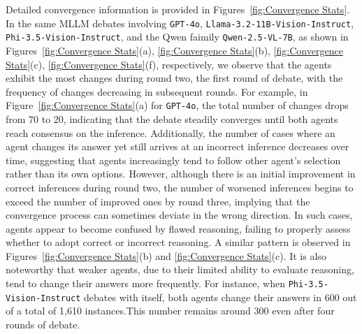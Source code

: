 \documentclass[11pt]{article}
\newcommand{\llamaname}{Llama-3.2-11B-Vision-Instruct}
\newcommand{\Qwenname}{Qwen-2.5-VL-7B}
\newcommand{\phiname}{Phi-3.5-Vision-Instruct}
\renewcommand{\arraystretch}{1.3}
\begin{document}
Detailed convergence information is provided in Figures~\ref{fig:Convergence Stats}. In the same MLLM debates involving \texttt{GPT-4o}, \texttt{\llamaname}, \texttt{\phiname}, and the Qwen faimily \texttt{\Qwenname}, as shown in Figures~\ref{fig:Convergence Stats}(a), \ref{fig:Convergence Stats}(b), \ref{fig:Convergence Stats}(c), \ref{fig:Convergence Stats}(f), respectively, we observe that the agents exhibit the most changes during round two, the first round of debate, with the frequency of changes decreasing in subsequent rounds. For example, in Figure~\ref{fig:Convergence Stats}(a) for \texttt{GPT-4o}, the total number of changes drops from 70 to 20, indicating that the debate steadily converges until both agents reach consensus on the inference. Additionally, the number of cases where an agent changes its answer yet still arrives at an incorrect inference decreases over time, suggesting that agents increasingly tend to follow other agent’s selection rather than its own options. However, although there is an initial improvement in correct inferences during round two, the number of worsened inferences begins to exceed the number of improved ones by round three, implying that the convergence process can sometimes deviate in the wrong direction. In such cases, agents appear to become confused by flawed reasoning, failing to properly assess whether to adopt correct or incorrect reasoning. A similar pattern is observed in Figures~\ref{fig:Convergence Stats}(b) and \ref{fig:Convergence Stats}(c). It is also noteworthy that weaker agents, due to their limited ability to evaluate reasoning, tend to change their answers more frequently. For instance, when \texttt{\phiname} debates with itself, both agents change their answers in 600 out of a total of 1,610 instances.This number remains around 300 even after four rounds of debate.

\begin{table}[t]
\centering
\small
\setlength{\tabcolsep}{5pt}
\renewcommand{\arraystretch}{1.12}
\caption{The performance comparison on GPT-4o: single inference, majority vote (10 independent runs), and two-agent debate (2 agents, 5 rounds).}
\label{tab:mv}
\end{table}
\end{document}
